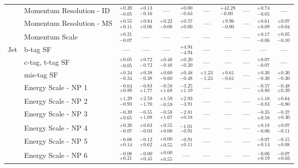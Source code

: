 \begin{tabular}{|cl||ccccccc|c||c|}
\cline{2-11}
&Momentum Resolution - ID &  $^{+0.20}_{-0.05}$  &  $^{+0.13}_{-0.16}$  & --- &  $^{+0.00}_{-0.63}$  & --- &  $^{+42.28}_{-0.00}$  & --- &  $^{+0.74}_{-0.05}$  & ---\\ 
\cline{2-11}
&Momentum Resolution - MS &  $^{+0.55}_{+0.11}$  &  $^{+0.84}_{+0.06}$  &  $^{+0.22}_{-0.00}$  &  $^{+0.57}_{+0.00}$  & --- &  $^{+9.96}_{-0.00}$  & --- &  $^{+0.61}_{+0.09}$  &  $^{+0.07}_{+0.04}$ \\ 
\cline{2-11}
&Momentum Scale &  $^{+0.21}_{-0.07}$  & --- & --- & --- & --- & --- & --- &  $^{+0.17}_{-0.06}$  &  $^{+0.05}_{-0.10}$ \\ 
\hline
\multirow{22}{*}{Jet}
&b-tag SF & --- & --- & --- &  $^{+4.94}_{-4.94}$  & --- & --- & --- & --- & ---\\ 
\cline{2-11}
&c-tag, t-tag SF &  $^{+0.05}_{-0.05}$  &  $^{+0.72}_{-0.72}$  &  $^{+0.48}_{-0.48}$  &  $^{+0.20}_{-0.20}$  & --- & --- & --- &  $^{+0.07}_{-0.07}$  & ---\\ 
\cline{2-11}
&mis-tag SF &  $^{+0.34}_{-0.34}$  &  $^{+0.38}_{-0.38}$  &  $^{+0.60}_{-0.60}$  &  $^{+0.48}_{-0.48}$  &  $^{+1.23}_{-1.23}$  &  $^{+0.61}_{-0.61}$  & --- &  $^{+0.30}_{-0.30}$  &  $^{+0.30}_{-0.30}$ \\ 
\cline{2-11}
&Energy Scale - NP 1 &  $^{-0.64}_{+0.89}$  &  $^{-0.83}_{+1.77}$  &  $^{-0.58}_{+1.68}$  &  $^{-3.25}_{+1.19}$  & --- & --- & --- &  $^{-0.57}_{+0.80}$  &  $^{-0.48}_{+0.39}$ \\ 
\cline{2-11}
&Energy Scale - NP 2 &  $^{+1.29}_{-0.93}$  &  $^{+2.59}_{-1.70}$  &  $^{+1.59}_{-0.59}$  &  $^{+2.93}_{-3.91}$  & --- & --- & --- &  $^{+1.16}_{-0.83}$  &  $^{+0.64}_{-0.80}$ \\ 
\cline{2-11}
&Energy Scale - NP 3 &  $^{-0.39}_{+0.65}$  &  $^{-0.55}_{+1.08}$  &  $^{-0.58}_{+1.67}$  &  $^{-2.81}_{+0.18}$  & --- & --- & --- &  $^{-0.35}_{+0.58}$  &  $^{-0.37}_{+0.30}$ \\ 
\cline{2-11}
&Energy Scale - NP 4 &  $^{+0.20}_{-0.07}$  &  $^{+0.63}_{-0.03}$  &  $^{+0.55}_{+0.00}$  &  $^{-1.01}_{-0.91}$  & --- & --- & --- &  $^{+0.18}_{-0.06}$  &  $^{+0.07}_{-0.11}$ \\ 
\cline{2-11}
&Energy Scale - NP 5 &  $^{-0.08}_{+0.14}$  &  $^{-0.12}_{+0.62}$  &  $^{+0.00}_{+0.55}$  &  $^{-0.91}_{+0.11}$  & --- & --- & --- &  $^{-0.07}_{+0.14}$  &  $^{-0.15}_{+0.08}$ \\ 
\cline{2-11}
&Energy Scale - NP 6 &  $^{-0.08}_{+0.21}$  &  $^{-0.00}_{+0.45}$  &  $^{+0.00}_{+0.55}$  & --- & --- & --- & --- &  $^{-0.06}_{+0.19}$  &  $^{-0.07}_{+0.03}$ \\ 

\end{tabular}
